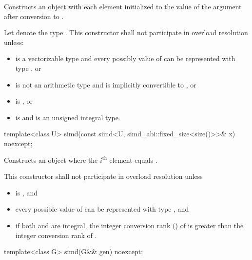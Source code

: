 \begin{itemdescr}
  \pnum\effects
  Constructs an object with each element initialized to the value of the argument after conversion to .

  \pnum\remarks
  Let  denote the type . This constructor shall not participate in overload resolution unless:
  \begin{itemize}
    \item {} is a vectorizable type and every possibly value of  can be represented with type , or
    \item {} is not an arithmetic type and is implicitly convertible to , or
    \item {} is , or
    \item {} is  and  is an unsigned integral type.
  \end{itemize}

\end{itemdescr}

\begin{itemdecl}
template<class U> simd(const simd<U, simd_abi::fixed_size<size()>>& x) noexcept;
\end{itemdecl}

\begin{itemdescr}
  \pnum\effects
  Constructs an object where the $i^\text{th}$ element equals  \foralli.

  \pnum\remarks
  This constructor shall not participate in overload resolution unless
  \begin{itemize}
    \item {} is , and
    \item every possible value of  can be represented with type , and
    \item if both  and  are integral, the integer conversion rank () of  is greater than the integer conversion rank of .
  \end{itemize}
\end{itemdescr}

\begin{itemdecl}
template<class G> simd(G&& gen) noexcept;
\end{itemdecl}

